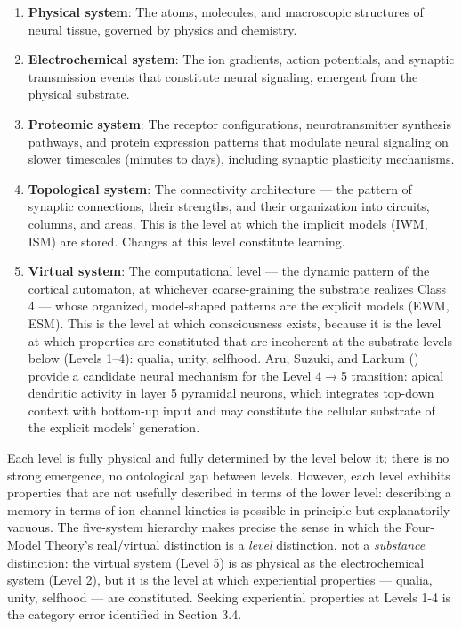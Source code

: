 \documentclass[12pt]{article}
\begin{document}
\begin{enumerate}
\item \textbf{Physical system}: The atoms, molecules, and macroscopic structures of neural tissue, governed by physics and chemistry.
\item \textbf{Electrochemical system}: The ion gradients, action potentials, and synaptic transmission events that constitute neural signaling, emergent from the physical substrate.
\item \textbf{Proteomic system}: The receptor configurations, neurotransmitter synthesis pathways, and protein expression patterns that modulate neural signaling on slower timescales (minutes to days), including synaptic plasticity mechanisms.
\item \textbf{Topological system}: The connectivity architecture --- the pattern of synaptic connections, their strengths, and their organization into circuits, columns, and areas. This is the level at which the implicit models (IWM, ISM) are stored. Changes at this level constitute learning.
\item \textbf{Virtual system}: The computational level --- the dynamic pattern of the cortical automaton, at whichever coarse-graining the substrate realizes Class 4 --- whose organized, model-shaped patterns are the explicit models (EWM, ESM). This is the level at which consciousness exists, because it is the level at which properties are constituted that are incoherent at the substrate levels below (Levels 1--4): qualia, unity, selfhood. Aru, Suzuki, and Larkum (\citeyear{AruSuzukiLarkum2020}) provide a candidate neural mechanism for the Level 4$\rightarrow$5 transition: apical dendritic activity in layer 5 pyramidal neurons, which integrates top-down context with bottom-up input and may constitute the cellular substrate of the explicit models' generation.
\end{enumerate}

Each level is fully physical and fully determined by the level below it; there is no strong emergence, no ontological gap between levels. However, each level exhibits properties that are not usefully described in terms of the lower level: describing a memory in terms of ion channel kinetics is possible in principle but explanatorily vacuous. The five-system hierarchy makes precise the sense in which the Four-Model Theory's real/virtual distinction is a \emph{level} distinction, not a \emph{substance} distinction: the virtual system (Level 5) is as physical as the electrochemical system (Level 2), but it is the level at which experiential properties --- qualia, unity, selfhood --- are constituted. Seeking experiential properties at Levels 1-4 is the category error identified in Section 3.4.
\end{document}
